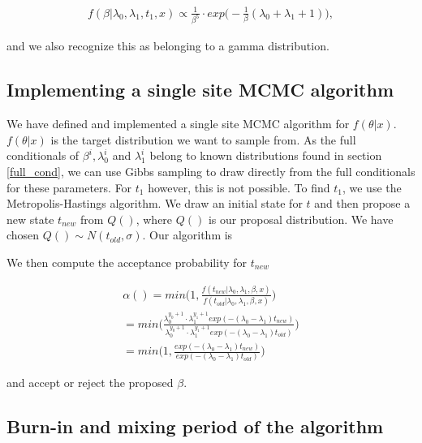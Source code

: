 \begin{align}
    f(\beta | \lambda_0, \lambda_1, t_1, x) \propto 
    \frac{1}{\beta^5} \cdot exp \Big( -\frac{1}{\beta}(\lambda_0 + \lambda_1 + 1) \Big),
\end{align}

and we also recognize this as belonging to a gamma distribution. 

\subsection{Implementing a single site MCMC algorithm}

We have defined and implemented a single site MCMC algorithm for $f(\theta |x)$. $f(\theta|x)$ is the target distribution we want to sample from.  As the full conditionals of $\beta^i, \lambda_0^i$ and $\lambda_1^i$ belong to known distributions found in section \ref{full_cond}, we can use Gibbs sampling to draw directly from the full conditionals for these parameters. For $t_1$ however, this is not possible.
To find $t_1$, we use the Metropolis-Hastings algorithm. We draw an initial state for $t$ and then propose a new state $t_{new}$ from $Q()$, where $Q()$ is our proposal distribution. We have chosen $Q() \sim N(t_{old}, \sigma)$.
Our algorithm is 

%



We then compute the acceptance probability for $t_{new}$

\begin{align}
    \alpha() = min \Big( 1, \frac{f(t_{new}| \lambda_0, \lambda_1, \beta, x)}{f(t_{old}| \lambda_0, \lambda_1, \beta, x)} \Big) \nonumber \\ 
    = min \Big( \frac{\lambda_0^{y_0 + 1} \cdot \lambda_1^{y_1 + 1} exp(-(\lambda_0 - \lambda_1)t_{new})}{\lambda_0^{y_0 + 1} \cdot \lambda_1^{y_1 + 1} exp(-(\lambda_0 - \lambda_1)t_{old})} \Big) \nonumber \\
    = min \Big( 1, \frac{exp(-(\lambda_0 - \lambda_1)t_{new})}{exp(-(\lambda_0 - \lambda_1)t_{old})} \Big)
\end{align}




and accept or reject the proposed $\beta$. 


\subsection{Burn-in and mixing period of the algorithm}

